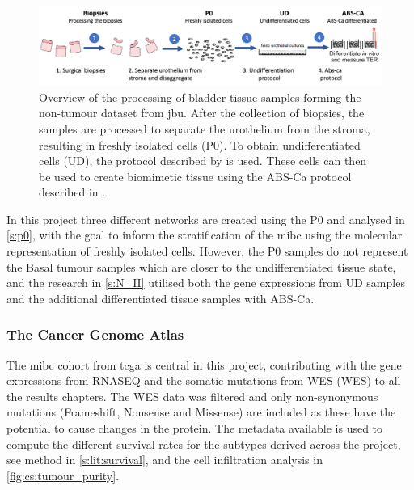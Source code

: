 \begin{figure}[!b]
    \centering
    \includegraphics[width=1.0\textwidth, keepaspectratio]{Sections/Lit_review/Resources/differentiation.png}
    \caption[How the biopsies from the non-tumour dataset are processed]{Overview of the processing of bladder tissue samples forming the non-tumour dataset from \acrfull{jbu}. After the collection of biopsies, the samples are processed to separate the urothelium from the stroma, resulting in freshly isolated cells (P0). To obtain undifferentiated cells (UD), the protocol described by \citet{Cross2005-fe} is used. These cells can then be used to create biomimetic tissue using the ABS-Ca protocol described in \citet{Cross2005-fe}.}
    \label{fig:lit:diff_samples}
\end{figure}


In this project three different networks are created using the P0 and analysed in \cref{s:p0}, with the goal to inform the stratification of the \acrshort{mibc} using the molecular representation of freshly isolated cells. However, the P0 samples do not represent the Basal tumour samples which are closer to the  undifferentiated tissue state, and the research in \cref{s:N_II} utilised both the gene expressions from UD samples and the additional differentiated tissue samples with ABS-Ca.

\subsubsection*{The Cancer Genome Atlas} \label{s:lit:tcga_data}

The \acrshort{mibc} cohort from \acrfull{tcga} is central in this project, contributing with the gene expressions from \gls{RNASEQ} and the somatic mutations from \gls{WES} (WES) to all the results chapters.  The WES data was filtered and only non-synonymous mutations (Frameshift, Nonsense and Missense) are included as these have the potential to cause changes in the protein. The metadata available is used to compute the different survival rates for the subtypes derived across the project, see method in \cref{s:lit:survival}, and the cell infiltration analysis in \cref{fig:cs:tumour_purity}.
